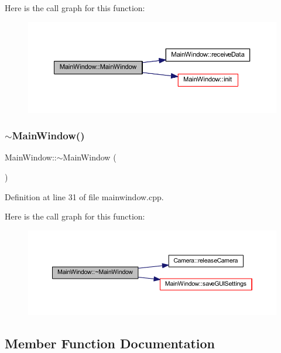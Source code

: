 Here is the call graph for this function\+:\nopagebreak
\begin{figure}[H]
\begin{center}
\leavevmode
\includegraphics[width=350pt]{class_main_window_a996c5a2b6f77944776856f08ec30858d_cgraph}
\end{center}
\end{figure}
\mbox{\label{class_main_window_ae98d00a93bc118200eeef9f9bba1dba7}} 
\subsubsection{\texorpdfstring{$\sim$MainWindow()}{~MainWindow()}}
{\footnotesize\ttfamily Main\+Window\+::$\sim$\+Main\+Window (\begin{DoxyParamCaption}{ }\end{DoxyParamCaption})}



Definition at line 31 of file mainwindow.\+cpp.

Here is the call graph for this function\+:
\nopagebreak
\begin{figure}[H]
\begin{center}
\leavevmode
\includegraphics[width=350pt]{class_main_window_ae98d00a93bc118200eeef9f9bba1dba7_cgraph}
\end{center}
\end{figure}


\subsection{Member Function Documentation}
\mbox{\label{class_main_window_a22df50c440a9aa974654f787d5935761}} 
